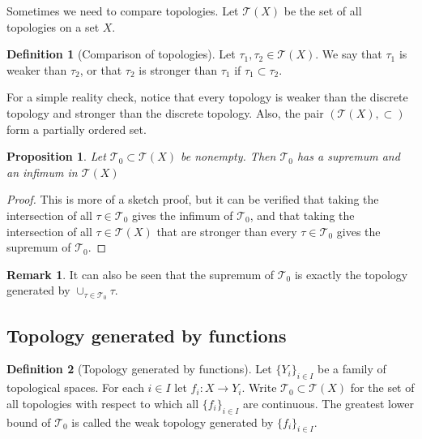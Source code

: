 \documentclass[11pt,a4paper]{article}
\theoremstyle{definition}
\newtheorem{definition}{Definition}[section]
\newtheorem{remark}{Remark}[section]
\theoremstyle{plain}
\newtheorem{proposition}[theorem]{Proposition}
\begin{document}
  Sometimes we need to compare topologies. Let $\mathcal{T}(X)$ be the set of
  all topologies on a set $X$.

  \begin{definition}[Comparison of topologies]
    Let $\tau_1,\tau_2 \in \mathcal{T}(X)$. We say that $\tau_1$ is weaker
    than $\tau_2$, or that $\tau_2$ is stronger than $\tau_1$ if 
    $\tau_1 \subset \tau_2$.
  \end{definition}

  For a simple reality check, notice that every topology is weaker than the
  discrete topology and stronger than the discrete topology. Also, the
  pair $(\mathcal{T}(X), \subset)$ form a partially ordered set.

  \begin{proposition}
    Let $\mathcal T_0 \subset \mathcal T(X)$ be nonempty. Then $\mathcal T_0$
    has a supremum and an infimum in $\mathcal T(X)$
  \end{proposition}
  \begin{proof}
    This is more of a sketch proof, but it can be verified that taking the
    intersection of all $\tau \in \mathcal T_0$ gives the infimum of 
    $\mathcal T_0$, and that taking the intersection of all 
    $\tau \in \mathcal T(X)$ that are stronger than every 
    $\tau \in \mathcal T_0$ gives the supremum of $\mathcal T_0$.
  \end{proof}

  \begin{remark}
    It can also be seen that the supremum of $\mathcal T_0$ is exactly the
    topology generated by $\cup_{\tau \in \mathcal T_0} \tau$.
  \end{remark}

  \subsection{Topology generated by functions}

  \begin{definition}[Topology generated by functions]
    Let $\{Y_i\}_{i \in I}$ be a family of topological spaces. For each
    $i \in I$ let $f_i \colon X \to Y_i$. Write $\mathcal{T}_0 \subset 
    \mathcal{T}(X)$ for the set of all topologies with respect to which all
    $\{f_i\}_{i \in I}$ are continuous. The greatest lower bound of 
    $\mathcal{T}_0$ is called the weak topology generated by 
    $\{f_i\}_{i \in I}$.
  \end{definition}
\end{document}
